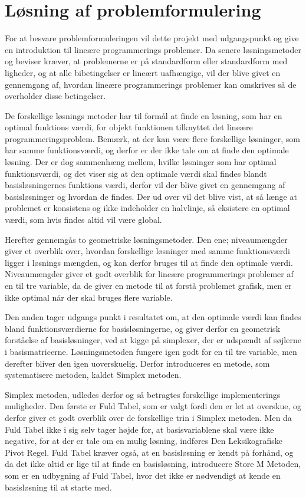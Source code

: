 \section{Løsning af problemformulering}
For at besvare problemformuleringen vil dette projekt med udgangspunkt \citep{bert} og \citep{lay} give en introduktion til lineære programmerings problemer. 
Da senere løsningsmetoder og beviser kræver, at problemerne er på standardform eller standardform med ligheder, og at alle bibetingelser er lineært uafhængige, vil der blive givet en gennemgang af, hvordan lineære programmerings problemer kan omskrives så de overholder disse betingelser.

De forskellige løsnings metoder har til formål at finde en løsning, som har en optimal funktions værdi, for objekt funktionen tilknyttet det lineære programmeringsproblem.
Bemærk, at der kan være flere forskellige løsninger, som har samme funktionsværdi, og derfor er der ikke tale om at finde den optimale løsning. 
Der er dog sammenhæng mellem, hvilke løsninger som har optimal funktionsværdi, og det viser sig at den optimale værdi skal findes blandt basisløsningernes funktions værdi, derfor vil der blive givet en gennemgang af basisløsninger og hvordan de findes.
Der ud over vil det blive vist, at så længe at problemet er konsistens og ikke indeholder en halvlinje, så eksistere en optimal værdi, som hvis findes altid vil være global.

Herefter gennemgås to geometriske løsningsmetoder.
Den ene; niveaumængder giver et overblik over, hvordan forskellige løsninger med samme funktionsværdi ligger i løsnings mængden, og kan derfor bruges til at finde den optimale værdi. 
Niveaumængder giver et godt overblik for lineære programmerings problemer af en til tre variable, da de giver en metode til at forstå problemet grafisk, men er ikke optimal når der skal bruges flere variable.

Den anden tager udgangs punkt i resultatet om, at den optimale værdi kan findes bland funktionsværdierne for basisløsningerne, og giver derfor en geometrisk forståelse af basisløsninger, ved at kigge på simplexer, der er udspændt af søjlerne i basismatricerne.
Løsningsmetoden fungere igen godt for en til tre variable, men derefter bliver den igen uoverskuelig.
Derfor introduceres en metode, som systematisere metoden, kaldet Simplex metoden.

Simplex metoden, udledes derfor og så betragtes forskellige implementerings muligheder.
Den første er Fuld Tabel, som er valgt fordi den er let at overskue, og derfor giver et godt overblik over de forskellige trin i Simplex metoden.
Men da Fuld Tabel ikke i sig selv tager højde for, at basisvariablene skal være ikke negative, for at der er tale om en mulig løsning, indføres Den Leksikografiske Pivot Regel.
Fuld Tabel kræver også, at en basisløsning er kendt på forhånd, og da det ikke altid er lige til at finde en basisløsning, introducere Store M Metoden, som er en udbygning af Fuld Tabel, hvor det ikke er nødvendigt at kende en basisløsning til at starte med.

